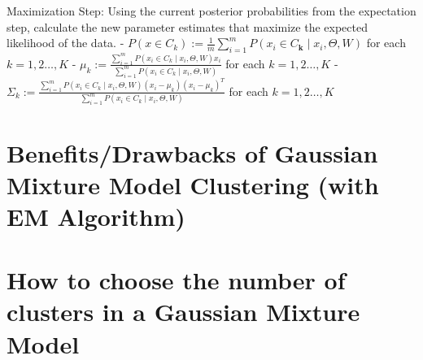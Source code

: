 \documentclass[11pt]{elegantbook}
\begin{document}
Maximization Step: Using the current posterior probabilities from the expectation step, calculate the new parameter estimates that maximize the expected likelihood of the data.
- $P\left(x \in C_k\right):=\frac{1}{m} \sum_{i=1}^m P\left(x_i \in C_{\boldsymbol{k}} \mid x_i, \Theta, W\right)$ for each $k=1,2 \ldots, K$
- $\mu_k:=\frac{\sum_{i=1}^m P\left(x_i \in C_k \mid x_i, \Theta, W\right) x_i}{\sum_{i=1}^m P\left(x_i \in C_k \mid x_i, \Theta, W\right)}$ for each $k=1,2 \ldots, K$
- $\Sigma_k:=\frac{\sum_{i=1}^m P\left(x_i \in C_k \mid x_i, \Theta, W\right)\left(x_i-\mu_k\right)\left(x_i-\mu_k\right)^T}{\sum_{i=1}^m P\left(x_i \in C_k \mid x_i, \Theta, W\right)}$ for each $k=1,2 \ldots, K$

















\section{Benefits/Drawbacks of Gaussian Mixture Model Clustering (with EM Algorithm)}














\section{How to choose the number of clusters in a Gaussian Mixture Model}
\end{document}
